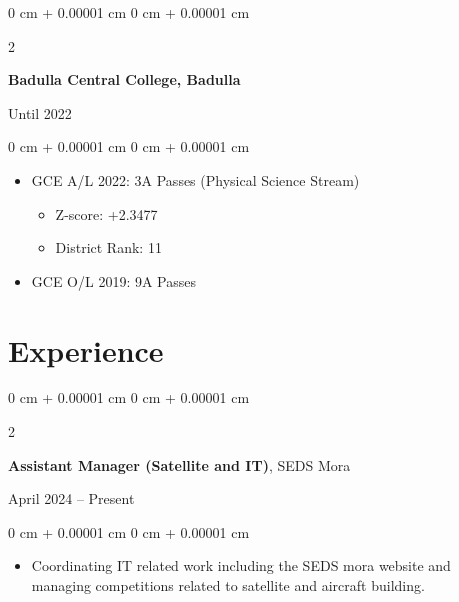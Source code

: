 \documentclass[10pt, letterpaper]{article}
\newenvironment{highlights}{
	\begin{itemize}[
		topsep=0.10 cm,
		parsep=0.10 cm,
		partopsep=0pt,
		itemsep=0pt,
		leftmargin=0 cm + 10pt
		]
	}{
	\end{itemize}
} %
\newenvironment{onecolentry}{
	\begin{adjustwidth}{
			0 cm + 0.00001 cm
		}{
			0 cm + 0.00001 cm
		}
	}{
	\end{adjustwidth}
} %
\newenvironment{twocolentry}[2][]{
	\onecolentry
	\def\secondColumn{#2}
	\setcolumnwidth{\fill, 4.5 cm}
	\begin{paracol}{2}
	}{
		\switchcolumn \raggedleft \secondColumn
	\end{paracol}
	\endonecolentry
} %
\begin{document}
	\vspace{0.2 cm}
	
	\begin{twocolentry}{Until 2022}
		\textbf{Badulla Central College, Badulla}
	\end{twocolentry}
	\vspace{0.10 cm}
	\begin{onecolentry}
		\begin{highlights}
			\item GCE A/L 2022: 3A Passes (Physical Science Stream)
			\begin{itemize}
				\item Z-score: +2.3477
			\end{itemize}
			\begin{itemize}
				\item District Rank: 11
			\end{itemize}
			\item GCE O/L 2019: 9A Passes
		\end{highlights}
	\end{onecolentry}
	
	\section{Experience}
	\begin{twocolentry}{April 2024 – Present}
		\textbf{Assistant Manager (Satellite and IT)}, SEDS Mora
	\end{twocolentry}
	\vspace{0.10 cm}
	\begin{onecolentry}
		\begin{highlights}
			\item Coordinating IT related work including the SEDS mora website and managing competitions related to satellite and aircraft building.
		\end{highlights}
	\end{onecolentry}
	
\end{document}
